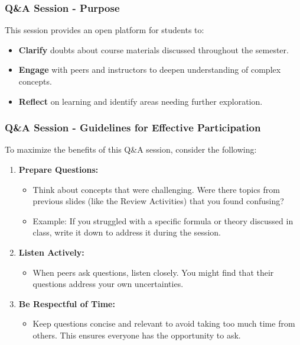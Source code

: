 \documentclass[aspectratio=169]{beamer}
\begin{document}
\begin{frame}[fragile]
  \frametitle{Q\&A Session - Purpose}
  This session provides an open platform for students to:
  \begin{itemize}
    \item \textbf{Clarify} doubts about course materials discussed throughout the semester.
    \item \textbf{Engage} with peers and instructors to deepen understanding of complex concepts.
    \item \textbf{Reflect} on learning and identify areas needing further exploration.
  \end{itemize}
\end{frame}

\begin{frame}[fragile]
  \frametitle{Q\&A Session - Guidelines for Effective Participation}
  To maximize the benefits of this Q\&A session, consider the following:
  \begin{enumerate}
    \item \textbf{Prepare Questions:}
      \begin{itemize}
        \item Think about concepts that were challenging. Were there topics from previous slides (like the Review Activities) that you found confusing?
        \item Example: If you struggled with a specific formula or theory discussed in class, write it down to address it during the session.
      \end{itemize}
    \item \textbf{Listen Actively:}
      \begin{itemize}
        \item When peers ask questions, listen closely. You might find that their questions address your own uncertainties.
      \end{itemize}
    \item \textbf{Be Respectful of Time:}
      \begin{itemize}
        \item Keep questions concise and relevant to avoid taking too much time from others. This ensures everyone has the opportunity to ask.
      \end{itemize}
  \end{enumerate}
\end{frame}
\end{document}
